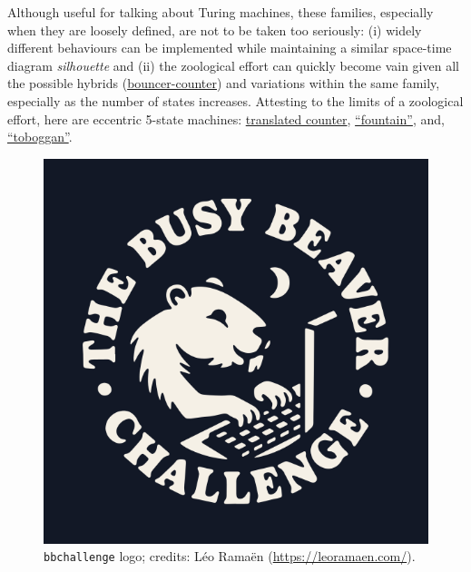 \documentclass[a4paper,british]{article}
\theoremstyle{definition} %
\numberwithin{equation}{section}
\theoremstyle{definition} %
\begin{document}
Although useful for talking about Turing machines, these families, especially when they are loosely defined, are not to be taken too seriously: (i) widely different behaviours can be implemented while maintaining a similar space-time diagram \textit{silhouette} and (ii) the zoological effort can quickly become vain given all the possible hybrids (\eg \href{https://bbchallenge.org/1RB---_1LC1RE_0RD0LC_1LB1LA_0RA1RE}{bouncer-counter}) and variations within the same family, especially as the number of states increases. Attesting to the limits of a zoological effort, here are eccentric 5-state machines: \href{https://bbchallenge.org/1RB0RA_1LC0LD_1RE1RD_1LA1LB_---1RC}{translated counter}, \href{https://bbchallenge.org/1RB0RD_1LC1LB_1RA0LB_0RE1RD_---1RA}{``fountain''}, and, \href{https://bbchallenge.org/1RB0RC_0LC---_1RD1RC_0LE1RA_1RD1LE}{``toboggan''}.






\begin{figure}[h!]
    \centering
    \includegraphics[scale=0.27]{figures/bbchallenge_logo.png}
    \caption{\texttt{bbchallenge} logo; credits: Léo Ramaën (\url{https://leoramaen.com/}).}
\end{figure}
\end{document}
